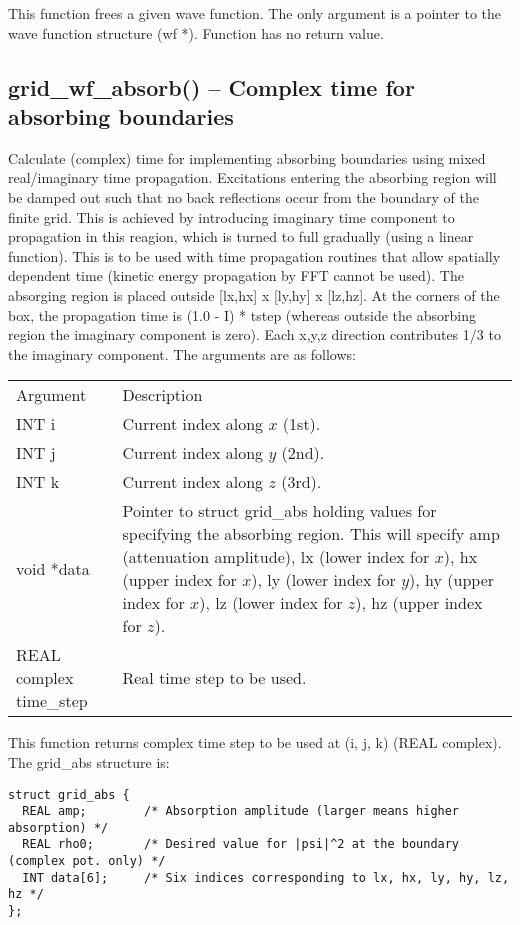 \documentclass[12pt,letterpaper]{report}
\begin{document}
This function frees a given wave function. The only argument is a pointer to the wave function structure (wf *). Function has no return value.

\subsection{grid\_wf\_absorb() -- Complex time for absorbing boundaries}

Calculate (complex) time for implementing absorbing boundaries using mixed real/imaginary time propagation. Excitations entering the absorbing region will be damped out
such that no back reflections occur from the boundary of the finite grid.
This is achieved by introducing imaginary time component to propagation
in this reagion, which is turned to full gradually (using a linear function).
This is to be used with time propagation routines that allow spatially dependent
time (kinetic energy propagation by FFT cannot be used). The absorging region is placed outside [lx,hx] x [ly,hy] x [lz,hz]. At the corners of the box, the propagation time
is (1.0 - I) * tstep (whereas outside the absorbing region the imaginary
component is zero). Each x,y,z direction contributes 1/3 to the imaginary component.
The arguments are as follows:
\begin{longtable}{p{} p{}}
Argument & Description\\
\cline{1-2}
INT i & Current index along $x$ (1st).\\                                                                                    
INT j & Current index along $y$ (2nd).\\
INT k & Current index along $z$ (3rd).\\
void *data & Pointer to struct grid\_abs holding values for specifying the absorbing region. This will specify amp (attenuation amplitude), lx (lower index for $x$), hx (upper index for $x$), ly (lower index for $y$), hy (upper index for $x$), lz (lower index for $z$), hz (upper index for $z$).\\
REAL complex time\_step & Real time step to be used.\\
\end{longtable}
\noindent
This function returns complex time step to be used at (i, j, k) (REAL complex). The grid\_abs structure is:
\begin{verbatim}
struct grid_abs {
  REAL amp;        /* Absorption amplitude (larger means higher absorption) */
  REAL rho0;       /* Desired value for |psi|^2 at the boundary (complex pot. only) */
  INT data[6];     /* Six indices corresponding to lx, hx, ly, hy, lz, hz */
};
\end{verbatim}
\end{document}
